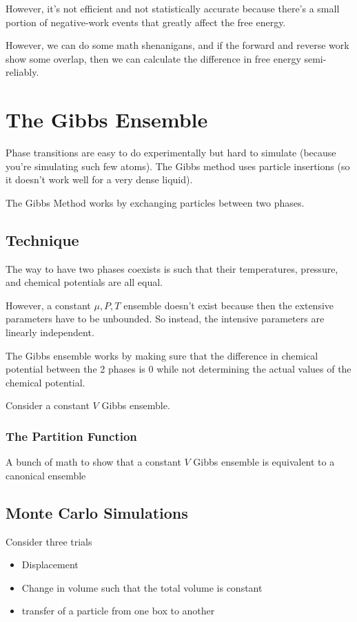 \documentclass[fleqn]{report}
\begin{document}
However, it's not efficient and not statistically accurate because there's a 
small portion of negative-work events that greatly affect the free energy. 

However, we can do some math shenanigans, and if the forward and reverse work 
show some overlap, then we can calculate the difference in free energy 
semi-reliably.

\chapter{The Gibbs Ensemble}
Phase transitions are easy to do experimentally but hard to simulate 
(because you're simulating such few atoms). The Gibbs method uses particle 
insertions (so it doesn't work well for a very dense liquid).

The Gibbs Method works by exchanging particles between two phases. 

\section{Technique}
The way to have two phases coexists is such that 
their temperatures, pressure, and chemical potentials are all equal. 

However, a constant $\mu, P, T$ ensemble doesn't exist because then the 
extensive parameters have to be unbounded. So instead, the intensive 
parameters are linearly independent.

The Gibbs ensemble works by making sure that the difference 
in chemical potential between the 2 phases is 0 while 
not determining the actual values of the chemical potential. 

Consider a constant $V$ Gibbs ensemble. 

\subsection{The Partition Function}
A bunch of math to show that a constant $V$ Gibbs ensemble 
is equivalent to a canonical ensemble 

\section{Monte Carlo Simulations}
Consider three trials 
\begin{itemize}
    \item 
    Displacement 
    \item 
    Change in volume such that the total volume is constant 
    \item 
    transfer of a particle from one box to another 
\end{itemize}
\end{document}
